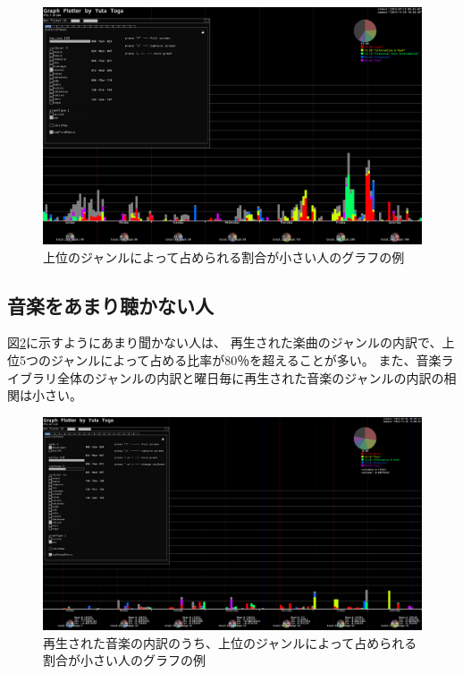 \documentclass[11pt, onecolumn]{jsarticle}
\begin{document}
\begin{figure}[h]
\begin{center}
\includegraphics[width=14cm]{topFive_light.png}
\caption{上位のジャンルによって占められる割合が小さい人のグラフの例}
\label{topFive_light}
\end{center}
\end{figure}

\subsection{音楽をあまり聴かない人}
図\ref{lightListner}に示すようにあまり聞かない人は、
再生された楽曲のジャンルの内訳で、上位5つのジャンルによって占める比率が80％を超えることが多い。
また、音楽ライブラリ全体のジャンルの内訳と曜日毎に再生された音楽のジャンルの内訳の相関は小さい。

\begin{figure}[h]
\begin{center}
\includegraphics[width=14cm]{takino.png}
\caption{再生された音楽の内訳のうち、上位のジャンルによって占められる割合が小さい人のグラフの例}
\label{lightListner}
\end{center}
\end{figure}
\end{document}
